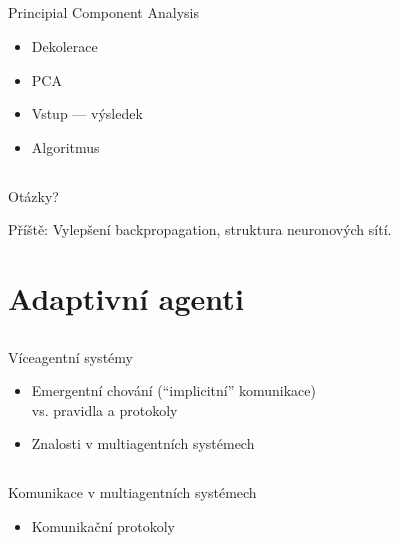 \documentclass{beamer}
\begin{document}
\subsection{}
\begin{frame}{Principial Component Analysis}
\begin{itemize}
\item Dekolerace
\item PCA
\item Vstup --- výsledek
\item Algoritmus
\end{itemize}
\end{frame}

\subsection{}
\begin{frame}{Otázky?}
\begin{center}
Příště: Vylepšení backpropagation, struktura neuronových sítí.
\end{center}
\end{frame}

\section{Adaptivní agenti}

\subsection{}
\begin{frame}{Víceagentní systémy}
\begin{itemize}
\item Emergentní chování (``implicitní'' komunikace) \\ vs. pravidla a protokoly
\item Znalosti v multiagentních systémech
\end{itemize}
\end{frame}

\subsection{}
\begin{frame}{Komunikace v multiagentních systémech}
\begin{itemize}
\item Komunikační protokoly
\end{itemize}
\end{frame}
\end{document}
